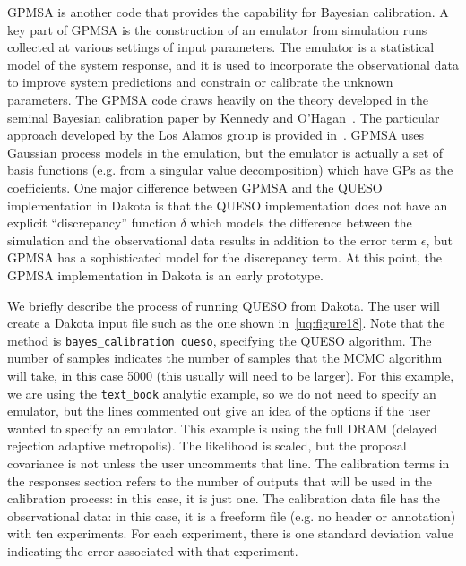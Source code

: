 GPMSA is another code that provides the capability for Bayesian 
calibration.
A key part of GPMSA is the construction of an emulator from simulation runs 
collected at various settings of input parameters. The emulator is a 
statistical model of the system response, and it is used to incorporate 
the observational data to improve system predictions and constrain or 
calibrate the unknown parameters. The GPMSA code draws heavily 
on the theory developed in the seminal Bayesian calibration paper 
by Kennedy and O'Hagan~\cite{Kenn01}. The particular approach developed 
by the Los Alamos group is provided in~\cite{Hig08}. GPMSA uses 
Gaussian process models in the emulation, but the emulator is 
actually a set of basis functions (e.g. from a singular value 
decomposition) which have GPs as the coefficients. One major 
difference between GPMSA and the QUESO implementation in Dakota 
is that the QUESO implementation does not have an explicit 
``discrepancy'' function $\delta$ which models the difference between 
the simulation and the observational data results in addition 
to the error term $\epsilon$, but GPMSA has a sophisticated 
model for the discrepancy term. 
At this point, the GPMSA implementation in Dakota is an early 
prototype. 
 

We briefly describe the process of running QUESO from Dakota.
The user will create a Dakota input file such as the one shown 
in~\ref{uq:figure18}. 
Note that the method is \texttt{bayes\_calibration queso}, 
specifying the QUESO algorithm. The number of 
samples indicates the number of samples that the MCMC algorithm 
will take, in this case 5000 (this usually will need to be larger). 
For this example, we are using the \texttt{text\_book} analytic 
example, so we do not need to specify an emulator, but the lines 
commented out give an idea of the options if the user wanted to 
specify an emulator. This example is using the full DRAM (delayed
rejection adaptive metropolis). The likelihood is scaled, but the 
proposal covariance is not unless the user uncomments that line. 
The calibration terms in the responses section refers to the 
number of outputs that will be used in the calibration process:  
in this case, it is just one. The calibration data file 
has the observational data:  in this case, it is a freeform file 
(e.g. no header or annotation) with ten experiments. For each 
experiment, there is one standard deviation value indicating the 
error associated with that experiment. 

